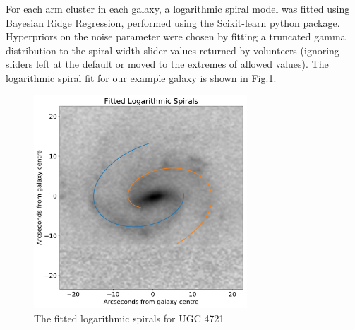 \documentclass[../main.tex]{subfiles}
\begin{document}
For each arm cluster in each galaxy, a logarithmic spiral model was fitted using Bayesian Ridge Regression, performed using the Scikit-learn python package. Hyperpriors on the noise parameter were chosen by fitting a truncated gamma distribution  to the spiral width slider values returned by volunteers (ignoring sliders left at the default or moved to the extremes of allowed values). The logarithmic spiral fit for our example galaxy is shown in Fig.\ref{fig:log_spirals}.

\begin{figure}
  \includegraphics[width=8cm]{images__results/log_spirals.pdf}
  \caption{The fitted logarithmic spirals for UGC 4721}
  \label{fig:log_spirals}
\end{figure}
\end{document}
